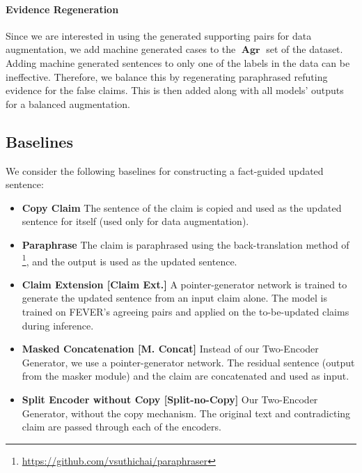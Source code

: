 \documentclass[letterpaper]{article}
\DeclareMathOperator{\A}{\boldsymbol{Agr}}
\begin{document}
\paragraph{Evidence Regeneration}
Since we are interested in using the generated supporting pairs for data augmentation, we add machine generated cases to the $\A$ set of the dataset. Adding machine generated sentences to only one of the labels in the data can be ineffective. Therefore, we balance this by regenerating paraphrased refuting evidence for the false claims. This is then added along with all models' outputs for a balanced augmentation.





\subsection{Baselines}
We consider the following baselines for constructing a fact-guided updated sentence:

\begin{itemize}
\item \textbf{Copy Claim} The sentence of the claim is copied and used as the updated sentence for itself (used only for data augmentation).

\item \textbf{Paraphrase} The claim is paraphrased using the back-translation method of \cite{wieting-gimpel-2018-paranmt}\footnote{\url{https://github.com/vsuthichai/paraphraser}}, and the output is used as the updated sentence.

\item \textbf{Claim Extension [Claim Ext.]} A pointer-generator network is trained to generate the updated sentence from an input claim alone. The model is trained on FEVER's agreeing pairs and applied on the to-be-updated claims during inference.

\item \textbf{Masked Concatenation [M. Concat]} Instead of our Two-Encoder Generator, we use a pointer-generator network.
The residual sentence (output from the masker module) and the claim are concatenated and used as input.

\item \textbf{Split Encoder without Copy [Split-no-Copy]} Our Two-Encoder Generator, without the copy mechanism. The original text and contradicting claim are passed through each of the encoders.



\end{itemize}
\end{document}
